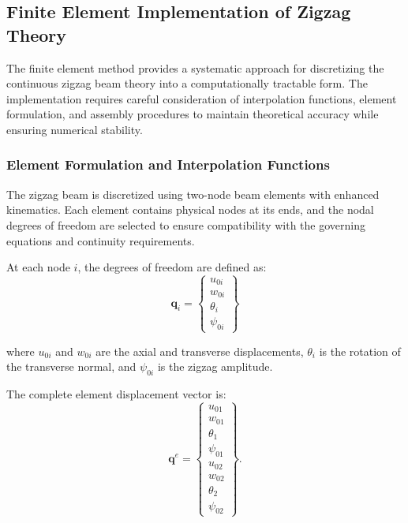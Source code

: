 \documentclass[12pt,a4paper]{report}
\begin{document}
\subsection{Finite Element Implementation of Zigzag Theory}

The finite element method provides a systematic approach for discretizing the continuous zigzag beam theory into a computationally tractable form. The implementation requires careful consideration of interpolation functions, element formulation, and assembly procedures to maintain theoretical accuracy while ensuring numerical stability.



\subsubsection*{Element Formulation and Interpolation Functions}

The zigzag beam is discretized using two-node beam elements with enhanced kinematics. Each element contains physical nodes at its ends, and the nodal degrees of freedom are selected to ensure compatibility with the governing equations and continuity requirements.

At each node $i$, the degrees of freedom are defined as:
\begin{equation}
    \mathbf{q}_i = \begin{Bmatrix} u_{0i} \\ w_{0i} \\ \theta_i \\ \psi_{0i} \end{Bmatrix}
\end{equation}

where $u_{0i}$ and $w_{0i}$ are the axial and transverse displacements, $\theta_i$ is the rotation of the transverse normal, and $\psi_{0i}$ is the zigzag amplitude.

The complete element displacement vector is:
\begin{equation}
    \mathbf{q}^e = \begin{Bmatrix} u_{01} \\ w_{01} \\ \theta_1 \\ \psi_{01} \\ u_{02} \\ w_{02} \\ \theta_2 \\ \psi_{02} \end{Bmatrix}.
\end{equation}
\end{document}
